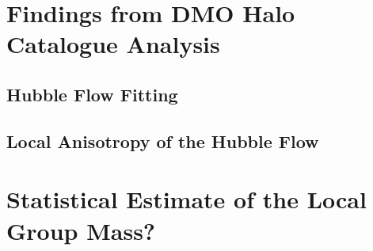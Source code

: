 \documentclass[english, oneside]{HYgradu}
\begin{document}
\chapter{Findings from DMO Halo Catalogue Analysis}

\section{Hubble Flow Fitting}

\section{Local Anisotropy of the Hubble Flow}

\chapter{Statistical Estimate of the Local Group Mass?} %


%
%
\end{document}
